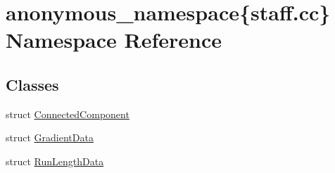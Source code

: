 \hypertarget{namespaceanonymous__namespace_02staff_8cc_03}{}\section{anonymous\+\_\+namespace\{staff.\+cc\} Namespace Reference}
\label{namespaceanonymous__namespace_02staff_8cc_03}
\subsection*{Classes}
\begin{DoxyCompactItemize}
\item 
struct \hyperlink{structanonymous__namespace_02staff_8cc_03_1_1ConnectedComponent}{Connected\+Component}
\item 
struct \hyperlink{structanonymous__namespace_02staff_8cc_03_1_1GradientData}{Gradient\+Data}
\item 
struct \hyperlink{structanonymous__namespace_02staff_8cc_03_1_1RunLengthData}{Run\+Length\+Data}
\end{DoxyCompactItemize}
